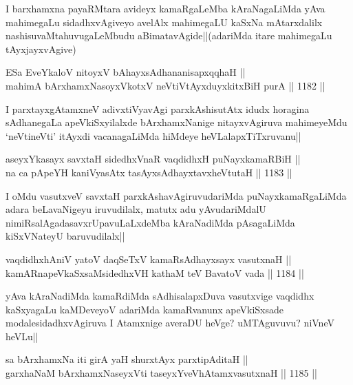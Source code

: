 \begin{artha}
I barxhamxna payaRMtara avideyx kamaRgaLeMba kAraNagaLiMda yAva mahimegaLu sidadhxvAgiveyo avelAlx mahimegaLU kaSxNa mAtarxdalilx nashisuvaMtahuvugaLeMbudu aBimatavAgide||(adariMda itare mahimegaLu tAyxjayxvAgive)
\end{artha}

\begin{shl}
ESa EveYkaloV nitoyxV bAhayxsAdhananisapxqqhaH || \\
mahimA bArxhamxNasoyxVkotxV neVtiVtAyxduyxkitxBiH purA ||  1182 ||  
\end{shl}

\begin{artha}
I parxtayxgAtamxneV adivxtiVyavAgi parxkAshisutAtx idudx horagina sAdhanegaLa apeVkiSxyilalxde bArxhamxNanige nitayxvAgiruva mahimeyeMdu `neVtineVti' itAyxdi vacanagaLiMda hiMdeye heVLalapxTiTxruvanu||
\end{artha}

\begin{shl}
aseyxYkasayx savxtaH sidedhxVnaR vaqdidhxH puNayxkamaRBiH || \\
na ca pApeYH kaniVyasAtx tasAyxsAdhayxtavxheVtutaH ||  1183 ||  
\end{shl}

\begin{artha}
I oMdu vasutxveV savxtaH parxkAshavAgiruvudariMda puNayxkamaRgaLiMda adara beLavaNigeyu iruvudilalx, matutx adu yAvudariMdalU nimiRsalAgadasavxrUpavuLaLxdeMba kAraNadiMda pAsagaLiMda kiSxVNateyU baruvudilalx||
\end{artha}


\begin{shl}
vaqdidhxhAniV yatoV daqSeTxV kamaRsAdhayxsayx vasutxnaH || \\
kamARnapeVkaSxsaMsidedhxVH kathaM teV BavatoV vada ||  1184 ||  
\end{shl}

\begin{artha}
yAva kAraNadiMda kamaRdiMda sAdhisalapxDuva vasutxvige vaqdidhx kaSxyagaLu kaMDeveyoV adariMda kamaRvanunx apeVkiSxsade modalesidadhxvAgiruva I Atamxnige averaDU heVge? uMTAguvuvu? niVneV heVLu||
\end{artha}


\begin{shl}
sa bArxhamxNa iti girA yaH shurxtAyx parxtipAditaH || \\
garxhaNaM bArxhamxNaseyxVti taseyxYveVhA\s \s tamxvasutxnaH ||  1185 ||  
\end{shl}

